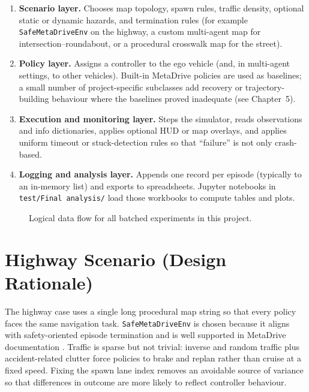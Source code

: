 \documentclass[12pt,a4paper]{report}
\begin{document}
\begin{enumerate}[label=\textbf{L\arabic*:}, leftmargin=2.2cm]
    \item \textbf{Scenario layer.} Chooses map topology, spawn rules, traffic density, optional static or dynamic hazards, and termination rules (for example \texttt{SafeMetaDriveEnv} on the highway, a custom multi-agent map for intersection--roundabout, or a procedural crosswalk map for the street).
    \item \textbf{Policy layer.} Assigns a controller to the ego vehicle (and, in multi-agent settings, to other vehicles). Built-in MetaDrive policies are used as baselines; a small number of project-specific subclasses add recovery or trajectory-building behaviour where the baselines proved inadequate (see Chapter~5).
    \item \textbf{Execution and monitoring layer.} Steps the simulator, reads observations and info dictionaries, applies optional HUD or map overlays, and applies uniform timeout or stuck-detection rules so that ``failure'' is not only crash-based.
    \item \textbf{Logging and analysis layer.} Appends one record per episode (typically to an in-memory list) and exports to spreadsheets. Jupyter notebooks in \texttt{test/Final analysis/} load those workbooks to compute tables and plots.
\end{enumerate}

\begin{figure}[H]
    \centering
    \caption{Logical data flow for all batched experiments in this project.}
    \label{fig:arch_layers}
\end{figure}

\section{Highway Scenario (Design Rationale)}
The highway case uses a single long procedural map string so that every policy faces the same navigation task. \texttt{SafeMetaDriveEnv} is chosen because it aligns with safety-oriented episode termination and is well supported in MetaDrive documentation \cite{metadrive_docs}. Traffic is sparse but not trivial: inverse and random traffic plus accident-related clutter force policies to brake and replan rather than cruise at a fixed speed. Fixing the spawn lane index removes an avoidable source of variance so that differences in outcome are more likely to reflect controller behaviour.
\end{document}
